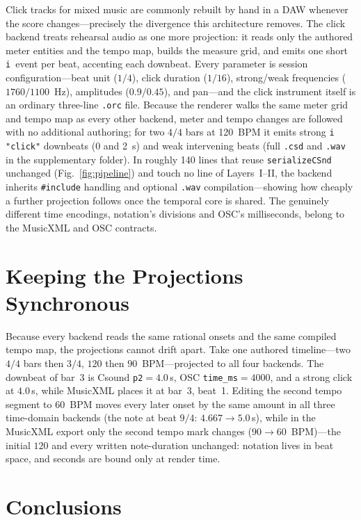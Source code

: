 \documentclass[runningheads,a4paper]{llncs}
\begin{document}
Click tracks for mixed music are commonly rebuilt by hand in a DAW whenever the
score changes---precisely the divergence this architecture removes. The click
backend treats rehearsal audio as one more projection: it reads only the
authored meter entities and the tempo map, builds the measure grid, and emits
one short \texttt{i}~event per beat, accenting each downbeat. Every parameter is
session configuration---beat unit ($1/4$), click duration ($1/16$), strong/weak
frequencies ($1760/1100$~Hz), amplitudes ($0.9/0.45$), and pan---and the click
instrument itself is an ordinary three-line \texttt{.orc} file. Because the
renderer walks the same meter grid and tempo map as every other backend, meter
and tempo changes are followed with no additional authoring; for two $4/4$ bars
at 120~BPM it emits strong \texttt{i "click"} downbeats (0 and 2~s) and weak
intervening beats (full \texttt{.csd} and \texttt{.wav} in the supplementary
folder). In roughly 140 lines that reuse \texttt{serializeCSnd} unchanged
(Fig.~\ref{fig:pipeline}) and touch no line of Layers~I--II, the backend
inherits \texttt{\#include} handling and optional \texttt{.wav}
compilation---showing how cheaply a further projection follows once the
temporal core is shared. The genuinely different
time encodings, notation's divisions and OSC's milliseconds, belong to the
MusicXML and OSC contracts.

\section{Keeping the Projections Synchronous}

Because every backend reads the same rational onsets and the same compiled
tempo map, the projections cannot drift apart. Take one authored timeline---two
$4/4$ bars then $3/4$, $120$ then $90$~BPM---projected to all four backends. The
downbeat of bar~3 is Csound \texttt{p2}$=4.0$\,s, OSC \texttt{time\_ms}$=4000$,
and a strong click at $4.0$\,s, while MusicXML places it at bar~3, beat~1.
Editing the second tempo segment to $60$~BPM moves every later onset by the same
amount in all three time-domain backends (the note at beat $9/4$: $4.667 \to
5.0$\,s), while in the MusicXML export only the second tempo mark changes ($90
\to 60$~BPM)---the initial $120$ and every written note-duration unchanged:
notation lives in beat space, and seconds are bound only at render time.

\section{Conclusions}
\end{document}
